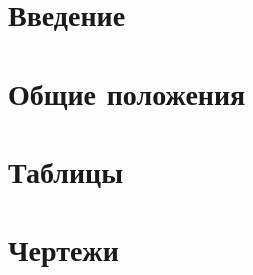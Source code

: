 \documentclass[11pt,oneside]{book}
\begin{document}
\newpage
\chapter{Введение}
\newpage
\newpage
\newpage
\chapter{Общие положения}
\newpage
\newpage
\newpage
\chapter{Таблицы}
\newpage
\newpage
\chapter{Чертежи}
\newpage
\tableofcontents
\end{document}
